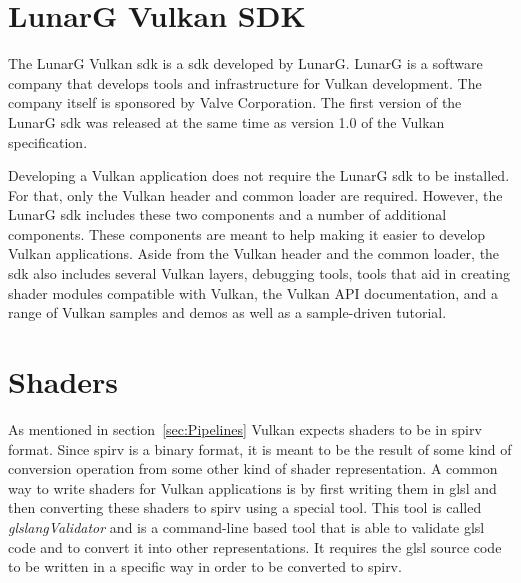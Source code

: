 




  \section{LunarG Vulkan SDK}
  \label{sec:LunarGSDK}
    The LunarG Vulkan \gls{sdk}\cite{lunargvulkansdk} is a \acrlong{sdk} developed by LunarG. LunarG is a software company that develops tools and infrastructure for Vulkan development. The company itself is sponsored by Valve Corporation. The first version of the LunarG \gls{sdk} was released at the same time as version 1.0 of the Vulkan specification.

    Developing a Vulkan application does not require the LunarG \gls{sdk} to be installed. For that, only the Vulkan header and common loader are required. However, the LunarG \gls{sdk} includes these two components and a number of additional components. These components are meant to help making it easier to develop Vulkan applications. Aside from the Vulkan header and the common loader, the \gls{sdk} also includes several Vulkan layers, debugging tools, tools that aid in creating shader modules compatible with Vulkan, the Vulkan API documentation, and a range of Vulkan samples and demos as well as a sample-driven tutorial.


  \section{Shaders}
  \label{sec:EnvShaders}
    As mentioned in section~\ref{sec:Pipelines} Vulkan expects shaders to be in \gls{spirv} format. Since \gls{spirv} is a binary format, it is meant to be the result of some kind of conversion operation from some other kind of shader representation.  A common way to write shaders for Vulkan applications is by first writing them in \gls{glsl} and then converting these shaders to \gls{spirv} using a special tool. This tool is called \textit{glslangValidator}\cite{glslangrepo} and is a command-line based tool that is able to validate \gls{glsl} code and to convert it into other representations. It requires the \gls{glsl} source code to be written in a specific way in order to be converted to \gls{spirv}.

